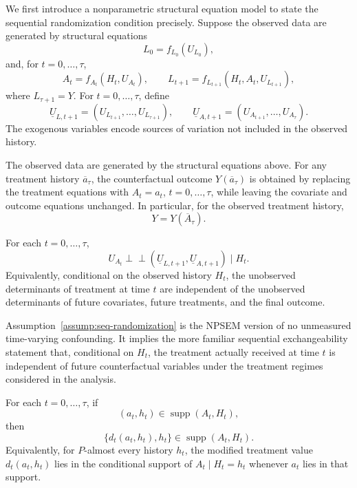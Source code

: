 \documentclass[11pt]{article}
\begin{document}
We first introduce a nonparametric structural equation model to state the
sequential randomization condition precisely. Suppose the observed data are
generated by structural equations
\[
  L_0 = f_{L_0}(U_{L_0}),
\]
and, for \(t=0,\ldots,\tau\),
\[
  A_t = f_{A_t}(H_t,U_{A_t}),
  \qquad
  L_{t+1} = f_{L_{t+1}}(H_t,A_t,U_{L_{t+1}}),
\]
where \(L_{\tau+1}=Y\). For \(t=0,\ldots,\tau\), define
\[
  \underline U_{L,t+1}
  =
  (U_{L_{t+1}},\ldots,U_{L_{\tau+1}}),
  \qquad
  \underline U_{A,t+1}
  =
  (U_{A_{t+1}},\ldots,U_{A_\tau}).
\]
The exogenous variables encode sources of variation not included in the observed
history.

\begin{assumption}[Consistency]
\label{assump:consistency}
The observed data are generated by the structural equations above. For any
treatment history \(\overline a_\tau\), the counterfactual outcome
\(Y(\overline a_\tau)\) is obtained by replacing the treatment equations with
\(A_t=a_t\), \(t=0,\ldots,\tau\), while leaving the covariate and outcome
equations unchanged. In particular, for the observed treatment history,
\[
  Y = Y(\overline A_\tau).
\]
\end{assumption}

\begin{assumption}
\label{assump:seq-randomization}
For each \(t=0,\ldots,\tau\),
\[
  U_{A_t}
  \perp\!\!\!\perp
  \left(
    \underline U_{L,t+1},
    \underline U_{A,t+1}
  \right)
  \mid H_t.
\]
Equivalently, conditional on the observed history \(H_t\), the unobserved
determinants of treatment at time \(t\) are independent of the unobserved
determinants of future covariates, future treatments, and the final outcome.
\end{assumption}

\begin{remark}
Assumption~\ref{assump:seq-randomization} is the NPSEM version of no unmeasured
time-varying confounding. It implies the more familiar sequential
exchangeability statement that, conditional on \(H_t\), the treatment actually
received at time \(t\) is independent of future counterfactual variables under
the treatment regimes considered in the analysis.
\end{remark}

\begin{assumption}
\label{assump:lmtp-support}
For each \(t=0,\ldots,\tau\), if
\[
  (a_t,h_t) \in \operatorname{supp}(A_t,H_t),
\]
then
\[
  \{d_t(a_t,h_t),h_t\}
  \in
  \operatorname{supp}(A_t,H_t).
\]
Equivalently, for \(P\)-almost every history \(h_t\), the modified treatment
value \(d_t(a_t,h_t)\) lies in the conditional support of \(A_t\mid H_t=h_t\)
whenever \(a_t\) lies in that support.
\end{assumption}
\end{document}
